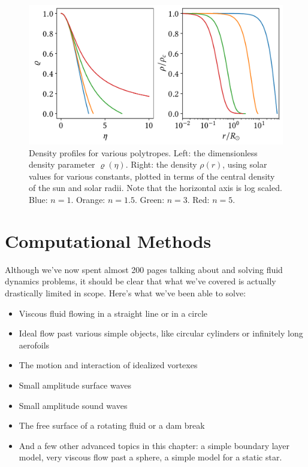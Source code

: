 \begin{figure}
\centering
\includegraphics[width=0.9\linewidth]{Figures/Chapter6/fig_polytropes}
\caption{Density profiles for various polytropes.  Left: the dimensionless density parameter $\varrho(\eta)$.  Right: the density $\rho(r)$, using solar values for various constants, plotted in terms of the central density of the sun and solar radii.  Note that the horizontal axis is log scaled. Blue: $n = 1$.  Orange: $n = 1.5$. Green: $n=3$.  Red: $n=5$. }
\label{fig_polytropes}
\end{figure}


%
% 

\section{Computational Methods}

Although we've now spent almost 200 pages talking about and solving fluid dynamics problems, it should be clear that what we've covered is actually drastically limited in scope.  Here's what we've been able to solve:
\begin{itemize}
\item Viscous fluid flowing in a straight line or in a circle
\item Ideal flow past various simple objects, like circular cylinders or infinitely long aerofoils
\item The motion and interaction of idealized vortexes
\item Small amplitude surface waves
\item Small amplitude sound waves
\item The free surface of a rotating fluid or a dam break
\item And a few other advanced topics in this chapter: a simple boundary layer model, very viscous flow past a sphere, a simple model for a static star.
\end{itemize}


